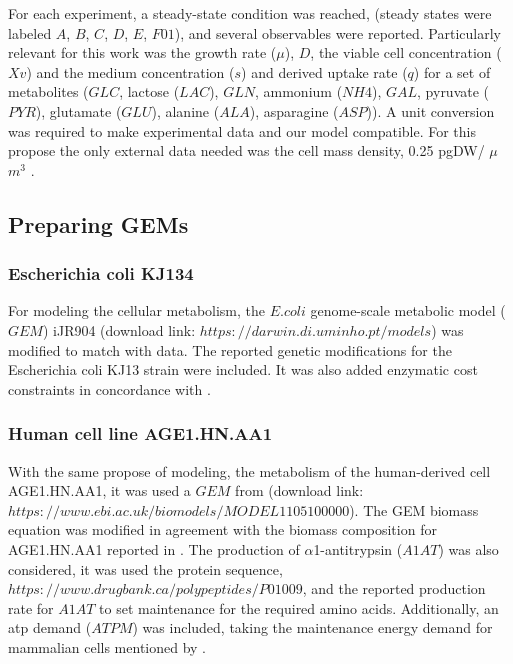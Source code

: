 \documentclass[]{article}
\begin{document}
	For each experiment, a steady-state condition was reached, (steady states were labeled $A$, $B$, $C$, $D$, $E$, $F01$), and several observables were reported. Particularly relevant for this work was the growth rate ($\mu$), $D$, the viable cell concentration ($Xv$) and the medium concentration ($s$) and derived uptake rate ($q$) for a set of metabolites ($GLC$, lactose ($LAC$), $GLN$, ammonium ($NH4$), $GAL$, pyruvate ($PYR$), glutamate ($GLU$), alanine ($ALA$), asparagine ($ASP$)). A unit conversion was required to make experimental data and our model compatible. For this propose the only external data needed was the cell mass density, 0.25 pgDW/ $\mu$$m^3$ .
	
	
	\subsection{Preparing GEMs} 
	
	\subsubsection{Escherichia coli KJ134}
	For modeling the cellular metabolism, the $E. coli$ genome-scale metabolic model ($GEM$) iJR904  (download link: $https://darwin.di.uminho.pt/models$) was modified to match with  data. The reported genetic modifications for the Escherichia coli KJ13 strain were included. It was also added enzymatic cost constraints in concordance with .
	
	
	\subsubsection{Human cell line AGE1.HN.AA1}
	With the same propose of modeling, the metabolism of the human-derived cell AGE1.HN.AA1, it was used a $GEM$ from (download link: $https://www.ebi.ac.uk/biomodels/MODEL1105100000$). The GEM biomass equation was modified in agreement with the biomass composition for AGE1.HN.AA1 reported in . The production of $\alpha$1-antitrypsin ($A1AT$) was also considered, it was used the protein sequence, $https://www.drugbank.ca/polypeptides/P01009$, and the reported production rate for $A1AT$  to set maintenance for the required amino acids. Additionally, an atp demand ($ATPM$) was included, taking the maintenance energy demand for mammalian cells mentioned by  .
		
\end{document}
